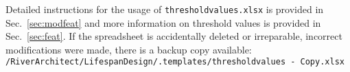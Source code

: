 Detailed instructions for the usage of \texttt{threshold{\myUnderscore}values.xlsx} is provided in Sec.~\ref{sec:modfeat} and more information on threshold values is provided in Sec.~\ref{sec:feat}. If the spreadsheet is accidentally deleted or irreparable, incorrect modifications were made, there is a backup copy available:\\
\texttt{/RiverArchitect/LifespanDesign/.templates/threshold{\myUnderscore}values - Copy.xlsx}

